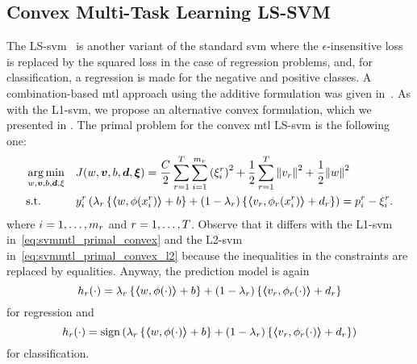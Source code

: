 \subsection{Convex Multi-Task Learning LS-SVM}
The LS-\acrshort{svm}~\citep{SuykensV99} is another variant of the standard \acrshort{svm} where the $\epsilon$-insensitive loss is replaced by the squared loss in the case of regression problems, and, for classification, a regression is made for the  negative and positive classes.
A combination-based \acrshort{mtl} approach using the additive formulation was given in~\cite{XuAQZ14}.
As with the L1-\acrshort{svm}, we propose an alternative convex formulation, which we presented in \cite{RuizAD21}.
The primal problem for the convex \acrshort{mtl} LS-\acrshort{svm} is the following one:
\begin{equation}\label{eq:svmmtl_primal_convex_ls}
    \begin{aligned}
    & \argmin_{w, \fv{v}, b, \fv{d}, \xi}
    & & {J({w}, \fv{v}, b, \fv{d}, \fv{\xi}) = \frac{C}{2} \sum_{r= 1}^T \sum_{i=1}^{m_r} \left({\xi_{i}^r}\right)^2 + \frac{1}{2} \sum_{r= 1}^T{\norm{{v}_r}^2} + \frac{1}{2} {\norm{{w}}}^2} \\
    & \text{s.t.}
    & & y_{i}^r \left(\lambda_r \left\lbrace \dotp{w}{\phi(x_{i}^r)} + b  \right\rbrace + (1 - \lambda_r) \left\lbrace \dotp{{v}_r}{\phi_r(x_{i}^r)} + d_r \right\rbrace  \right) = p_{i}^r - \xi_{i}^r .  \\
    \end{aligned}
\end{equation}
where $i=1, \ldots, m_r$ and $r=1, \ldots, T$.
Observe that it differs with the L1-\acrshort{svm} in~\eqref{eq:svmmtl_primal_convex} and the L2-\acrshort{svm} in~\eqref{eq:svmmtl_primal_convex_l2} because the inequalities in the constraints are replaced by equalities.
Anyway, the prediction model is again
\begin{equation}
    \nonumber
    h_r(\cdot) = \lambda_r \left\lbrace \bm{\left\langle} w, \phi(\cdot) \bm{\right\rangle} + b  \right\rbrace + (1 - \lambda_r) \left\lbrace \bm{\left\langle} {v}_r, \phi_r(\cdot) \bm{\right\rangle} + d_r \right\rbrace
\end{equation}
for regression and 
\begin{equation}
    \nonumber
    h_r(\cdot) = \operatorname{sign}{ \left(\lambda_r \left\lbrace \bm{\left\langle} w, \phi(\cdot) \bm{\right\rangle} + b  \right\rbrace + (1 - \lambda_r) \left\lbrace \bm{\left\langle} {v}_r, \phi_r(\cdot) \bm{\right\rangle} + d_r \right\rbrace \right)}
\end{equation}
for classification.
%

